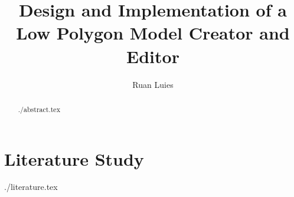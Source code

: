 \documentclass[11pt]{report}
\author{Ruan Luies}
\title{Design and Implementation of a Low Polygon Model Creator and Editor}
\begin{document}
\maketitle
\begin{abstract}
{./abstract.tex}
\end{abstract}
\chapter{Literature Study}
{./literature.tex}
\end{document}
